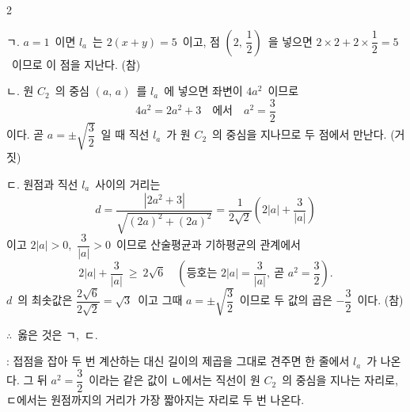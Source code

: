 \documentclass[10pt,fleqn]{article}
\begin{document}
\begin{multicols*}{2}
\begin{center}
\end{center}

ㄱ. $a=1$\ 이면 $l_{a}$\ 는 $2(x+y)=5$\ 이고, 점 $\left(2,\,\dfrac{1}{2}\right)$\ 을 넣으면 $2\times 2+2\times\dfrac{1}{2}=5$\ 이므로 이 점을 지난다. (참)

ㄴ. 원 $C_{2}$\ 의 중심 $(a,\,a)$\ 를 $l_{a}$\ 에 넣으면 좌변이 $4a^{2}$\ 이므로
$$4a^{2}=2a^{2}+3\quad\text{에서}\quad a^{2}=\dfrac{3}{2}$$
이다. 곧 $a=\pm\sqrt{\dfrac{3}{2}}$\ 일 때 직선 $l_{a}$\ 가 원 $C_{2}$\ 의 중심을 지나므로 두 점에서 만난다. (거짓)

ㄷ. 원점과 직선 $l_{a}$\ 사이의 거리는
$$d=\dfrac{|2a^{2}+3|}{\sqrt{(2a)^{2}+(2a)^{2}}}=\dfrac{1}{2\sqrt{2}}\left(2|a|+\dfrac{3}{|a|}\right)$$
이고 $2|a|>0$,\ $\dfrac{3}{|a|}>0$\ 이므로 산술평균과 기하평균의 관계에서
$$2|a|+\dfrac{3}{|a|}\ \ge\ 2\sqrt{6}\quad\left(\text{등호는 }2|a|=\dfrac{3}{|a|},\ \text{곧 }a^{2}=\dfrac{3}{2}\right).$$
$d$\ 의 최솟값은 $\dfrac{2\sqrt{6}}{2\sqrt{2}}=\sqrt{3}$\ 이고 그때 $a=\pm\sqrt{\dfrac{3}{2}}$\ 이므로 두 값의 곱은 $-\dfrac{3}{2}$\ 이다. (참)

$\therefore$\ 옳은 것은 ㄱ,\ ㄷ.

\begin{dmcriticalpoint}
: 접점을 잡아 두 번 계산하는 대신 길이의 제곱을 그대로 견주면 한 줄에서 $l_{a}$\ 가 나온다. 그 뒤 $a^{2}=\dfrac{3}{2}$\ 이라는 같은 값이 ㄴ에서는 직선이 원 $C_{2}$\ 의 중심을 지나는 자리로, ㄷ에서는 원점까지의 거리가 가장 짧아지는 자리로 두 번 나온다.
\end{dmcriticalpoint}


\end{multicols*}
\end{document}
